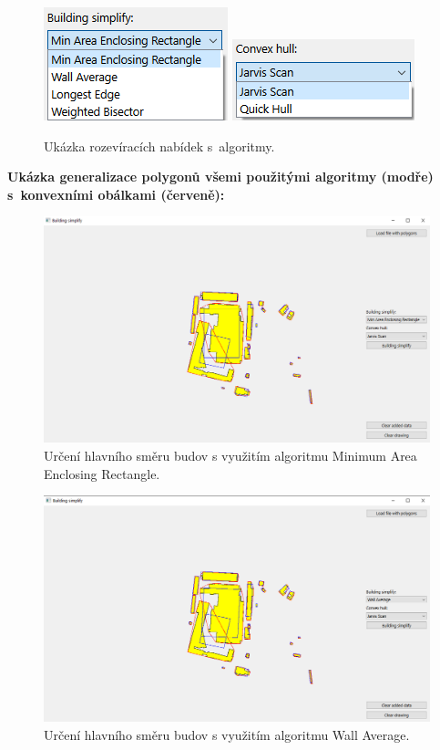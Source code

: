 \documentclass[a4paper, 12pt, oneside, titlepage]{article} %
\begin{document}
\begin{figure}[!htb]
	\centering
	\includegraphics[scale=1]{obrazky/alg_vyber.png} 
	\includegraphics[scale=1]{obrazky/ch_vyber.png} 
	\caption{Ukázka rozevíracích nabídek s~algoritmy.
	}
	\label{fig:vyber}
\end{figure} 
\FloatBarrier

\textbf{Ukázka generalizace polygonů všemi použitými algoritmy (modře) s~konvexními obálkami (červeně):}
\begin{figure}[!htb]
	\centering
	\includegraphics[scale=0.5]{obrazky/maer.png} 
	\caption{Určení hlavního směru budov s využitím algoritmu Minimum Area Enclosing Rectangle.
	}
	\label{fig:maer}
\end{figure} 
\FloatBarrier

\begin{figure}[!htb]
	\centering
	\includegraphics[scale=0.5]{obrazky/wall_avr.png} 
	\caption{Určení hlavního směru budov s využitím algoritmu Wall Average.
	}
	\label{fig:wall_avr}
\end{figure} 
\FloatBarrier
\end{document}
